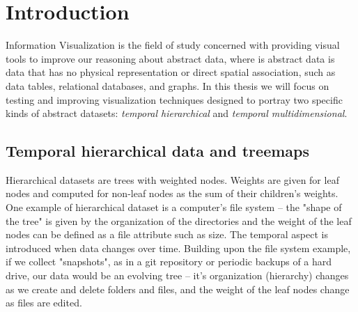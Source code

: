 \chapter{Introduction}






Information Visualization is the field of study concerned with providing visual tools to improve our reasoning about abstract data, where is abstract data is data that has no physical representation or direct spatial association, such as data tables, relational databases, and graphs.
In this thesis we will focus on testing and improving visualization techniques designed to portray two specific kinds of abstract datasets: \emph{temporal hierarchical} and \emph{temporal multidimensional}.

\section{Temporal hierarchical data and treemaps}

Hierarchical datasets are trees with weighted nodes. Weights are given for leaf nodes and computed for non-leaf nodes as the sum of their children's weights. One example of hierarchical dataset is a computer's file system -- the "shape of the tree" is given by the organization of the directories and the weight of the leaf nodes can be defined as a file attribute such as size.
The temporal aspect is introduced when data changes over time. Building upon the file system example, if we collect "snapshots", as in a git repository or periodic backups of a hard drive, our data would be an evolving tree -- it's organization (hierarchy) changes as we create and delete folders and files, and the weight of the leaf nodes change as files are edited.

